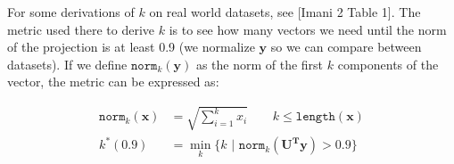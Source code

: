 \documentclass[twoside,11pt]{article}
\begin{document}
For some derivations of $k$ on real world datasets, see  [Imani 2 Table 1]. The metric used there to derive $k$ is to see how many vectors we need until the norm of the projection is at least 0.9 (we normalize $\mathbf{y}$ so we can compare between datasets). If we define $\texttt{norm}_k(\mathbf{y})$ as the norm of the first $k$ components of the vector, the metric can be expressed as:

$$
\begin{aligned}
\texttt{norm}_k(\mathbf{x}) &= \sqrt{\sum_{i=1}^k x_i } \qquad k \leq \texttt{length}(\mathbf{x}) \\
k^*(0.9) &= \min_k \biggl\{ k \,\, \bigg| \,\, \texttt{norm}_k(\mathbf{\mathbf{U}^T y}) > 0.9\biggr\} \\
\end{aligned}
$$



\newpage

\appendix
\section{}
\label{app:theorem}



\noindent

\section{}

\noindent


\vskip 0.2in

\end{document}
